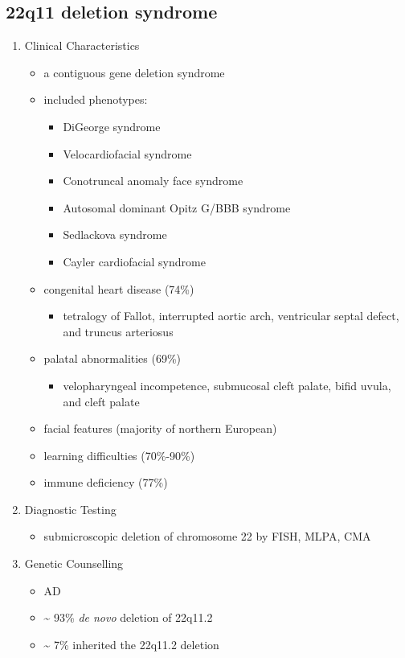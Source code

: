 \documentclass[12pt]{scrartcl}
\begin{document}
\subsection{22q11 deletion syndrome}
\label{sec:orgf5c676c}
\begin{enumerate}
\item Clinical Characteristics
\label{sec:orgcfa28a5}
\begin{itemize}
\item a contiguous gene deletion syndrome
\item included phenotypes:
\begin{itemize}
\item DiGeorge syndrome
\item Velocardiofacial syndrome
\item Conotruncal anomaly face syndrome
\item Autosomal dominant Opitz G/BBB syndrome
\item Sedlackova syndrome
\item Cayler cardiofacial syndrome
\end{itemize}

\item congenital heart disease (74\%)
\begin{itemize}
\item tetralogy of Fallot, interrupted aortic arch, ventricular septal defect, and truncus arteriosus
\end{itemize}
\item palatal abnormalities (69\%)
\begin{itemize}
\item velopharyngeal incompetence, submucosal cleft palate, bifid uvula, and cleft palate
\end{itemize}
\item facial features (majority of northern European)
\item learning difficulties (70\%-90\%)
\item immune deficiency (77\%)
\end{itemize}

\item Diagnostic Testing
\label{sec:org58c1fa9}
\begin{itemize}
\item submicroscopic deletion of chromosome 22 by FISH, MLPA, CMA
\end{itemize}

\item Genetic Counselling
\label{sec:org4e5244d}
\begin{itemize}
\item AD
\item \textasciitilde{} 93\% \emph{de novo} deletion of 22q11.2
\item \textasciitilde{} 7\% inherited the 22q11.2 deletion
\end{itemize}
\end{enumerate}
\end{document}
